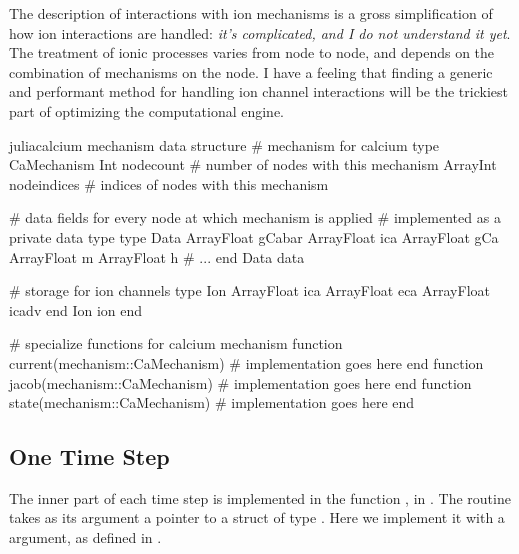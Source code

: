 \begin{note}
The description of interactions with ion mechanisms is a gross simplification of how ion interactions are handled: \emph{it's complicated, and I do not understand it yet}.
The treatment of ionic processes varies from node to node, and depends on the combination of mechanisms on the node.
I have a feeling that finding a generic and performant method for handling ion channel interactions will be the trickiest part of optimizing the computational engine.
\end{note}

\begin{inlinelisting}{julia}{calcium mechanism data structure}
# mechanism for calcium
type CaMechanism
  Int        nodecount   # number of nodes with this mechanism
  Array{Int} nodeindices # indices of nodes with this mechanism

  # data fields for every node at which mechanism is applied
  # implemented as a private data type
  type Data
    Array{Float} gCabar
    Array{Float} ica
    Array{Float} gCa
    Array{Float} m
    Array{Float} h
    # ...
  end
  Data data

  # storage for ion channels
  type Ion
    Array{Float} ica
    Array{Float} eca
    Array{Float} icadv
  end
  Ion ion
end

# specialize functions for calcium mechanism
function current(mechanism::CaMechanism)
    # implementation goes here
end
function jacob(mechanism::CaMechanism)
    # implementation goes here
end
function state(mechanism::CaMechanism)
    # implementation goes here
end
\end{inlinelisting}

\clearpage
\subsection{One Time Step}
The inner part of each time step is implemented in the function , in . The routine takes as its argument a pointer to a struct of type . Here we implement it with a  argument, as defined in .


